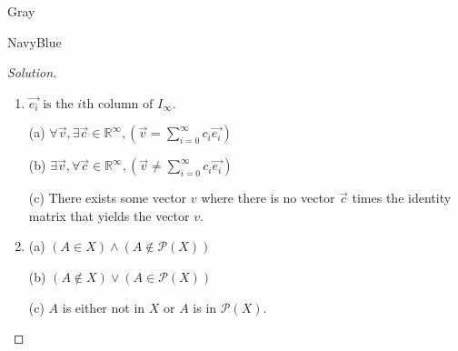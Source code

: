 \documentclass[12pt]{amsart}
\theoremstyle{named}
\newenvironment{soln}
{\begin{color}{Gray}\begin{framed}\begin{color}{NavyBlue}\begin{proof}[Solution]
\doublespacing}
{\end{proof}\end{color}\end{framed}\end{color}}
\theoremstyle{definition}
\begin{document}
\begin{soln}
\begin{enumerate}
        \item \phantom{ }
        
        \noindent $\displaystyle\vec{e_i} \text{ is the } i \text{th column of }I_\infty. $ 
        
        \noindent (a)
        $\forall \vec{v},\exists \vec{c} \in \mathbb R^{\infty},(\vec{v} = \sum_{i=0}^\infty c_i\vec{e_i})$

        \noindent (b)
        $\exists \vec{v},\forall \vec{c} \in \mathbb R^{\infty},(\vec{v} \neq \sum_{i=0}^\infty c_i\vec{e_i})$
        
        \noindent (c) There exists some vector $v$ where there is no vector $\vec{c}$ times
        the identity matrix that yields the vector $v$.

        \item \phantom{ }
        
        \noindent (a) $(A \in X) \land (A \notin \mathscr P (X))$

        \noindent (b) $(A \notin X) \lor (A \in \mathscr P (X))$
        
        \noindent (c) $A$ is either not in $X$ or $A$ is in $\mathscr P(X)$.

    \end{enumerate}
\end{soln}
\end{document}
